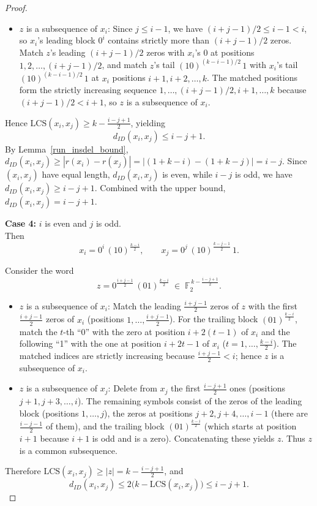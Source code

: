 \documentclass[11 pt]{article}
\numberwithin{equation}{section}
\begin{document}
\begin{proof}
\begin{itemize}
    
    \item {$z$ is a subsequence of $x_i$:}  
    Since $j \leq i - 1$, we have $(i+j-1)/2 \leq i - 1 < i$, so $x_i$'s leading block $0^{i}$ contains strictly more than $(i+j-1)/2$ zeros. Match $z$'s leading $(i+j-1)/2$ zeros with $x_i$'s 0 at positions $1, 2, \ldots, (i+j-1)/2$, and match $z$'s tail $(10)^{(k-i-1)/2}\,1$ with $x_i$'s tail $(10)^{(k-i-1)/2}\,1$ at $x_i$ positions $i+1, i+2, \ldots, k$. The matched positions form the strictly increasing sequence $1, \ldots, (i+j-1)/2, i+1, \ldots, k$ because $(i+j-1)/2 < i + 1$, so $z$ is a subsequence of $x_i$.
    \end{itemize}
    Hence $\mathrm{LCS}(x_i, x_j) \geq k - \frac{i-j+1}{2}$, yielding  
    \[
    d_{ID}(x_i, x_j)  \leq i - j + 1.
    \]  
    By Lemma~\ref{run_insdel_bound}, $d_{ID}(x_i,x_j)\ge |r(x_i)-r(x_j)| = |(1+k-i)-(1+k-j)| = i-j$. Since $(x_i,x_j)$ have equal length, $d_{ID}(x_i,x_j)$ is even, while $i-j$ is odd, we have $d_{ID}(x_i,x_j)\ge i-j+1$. Combined with the upper bound, $d_{ID}(x_i,x_j)=i-j+1$. 

    \smallskip

    \noindent \textbf{Case 4:} $i$ is even and $j$ is odd.\\
    
    Then
    \[
    x_i = 0^{i}\,(10)^{\frac{k-i}{2}}, \qquad 
    x_j = 0^{j}\,(10)^{\frac{k-j-1}{2}}\,1.
    \]

    
    Consider the word
    \[
    z = 0^{\frac{i+j-1}{2}}\,(01)^{\frac{k-i}{2}} \;\in\; \mathbb{F}_2^{\,k - \frac{i-j+1}{2}}.
    \]
    \begin{itemize}
    \item {$z$ is a subsequence of $x_i$:} 
    Match the leading $\frac{i+j-1}{2}$ zeros of $z$ with the first $\frac{i+j-1}{2}$ zeros of $x_i$ 
    (positions $1,\dots,\frac{i+j-1}{2}$). 
    For the trailing block $(01)^{\frac{k-i}{2}}$, match the $t$-th ``0'' with the zero at position 
    $i+2(t-1)$ of $x_i$ and the following ``1'' with the one at position $i+2t-1$ of $x_i$ 
    ($t=1,\dots,\frac{k-i}{2}$). 
    The matched indices are strictly increasing because $\frac{i+j-1}{2} < i$; hence $z$ is a subsequence of $x_i$.

    \item {$z$ is a subsequence of $x_j$:} 
    Delete from $x_j$ the first $\frac{i-j+1}{2}$ ones (positions $j+1, j+3, \dots, i$). 
    The remaining symbols consist of the zeros of the leading block (positions $1,\dots,j$), 
    the zeros at positions $j+2, j+4, \dots, i-1$ (there are $\frac{i-j-1}{2}$ of them), 
    and the trailing block $(01)^{\frac{k-i}{2}}$ (which starts at position $i+1$ because $i+1$ is odd and is a zero). 
    Concatenating these yields $z$. Thus $z$ is a common subsequence.
    \end{itemize}
    Therefore $\mathrm{LCS}(x_i,x_j) \ge |z| = k - \frac{i-j+1}{2}$, and
    \[
    d_{ID}(x_i,x_j) \le 2\bigl(k - \mathrm{LCS}(x_i,x_j)\bigr) \le i - j + 1.
    \]



\end{proof}
\end{document}
